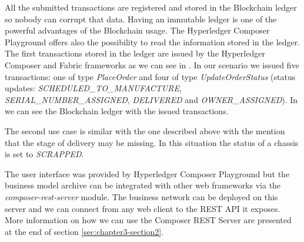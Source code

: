 All the submitted transactions are registered and stored in the Blockchain ledger so nobody can corrupt that data. Having an immutable ledger is one of the powerful advantages of the Blockchain usage. The Hyperledger Composer Playground offers also the possibility to read the information stored in the ledger. The first transactions stored in the ledger are issued by the Hyperledger Composer and Fabric frameworks as we can see in . In our scenario we issued five transactions: one of type \emph{PlaceOrder} and four of type \emph{UpdateOrderStatus} (status updates: \emph{SCHEDULED_TO_MANUFACTURE}, \emph{SERIAL_NUMBER_ASSIGNED}, \emph{DELIVERED} and \emph{OWNER_ASSIGNED}). In  we can see the Blockchain ledger with the issued transactions.



The second use case is similar with the one described above with the mention that the stage of delivery may be missing. In this situation the status of a chassis is set to \emph{SCRAPPED}.

The user interface was provided by Hyperledger Composer Playground but the business model archive can be integrated with other web frameworks via the \emph{composer-rest-server} module. The business network can be deployed on this server and we can connect from any web client to the REST API it exposes. More information on how we can use the Composer REST Server are presented at the end of section \ref{sec:chapter3-section2}.

